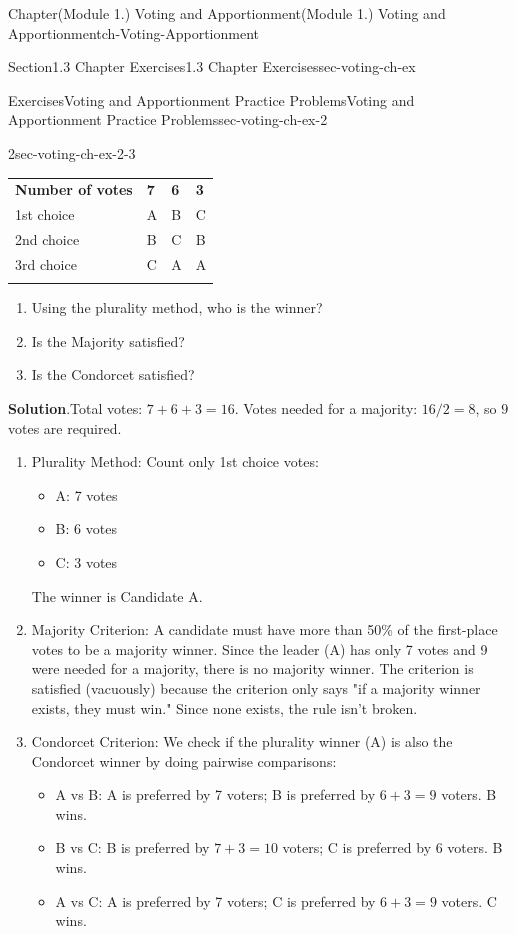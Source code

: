\documentclass[oneside,10pt,]{book}
\newcommand{\blocktitlefont}{\relax}
\newcommand{\tabularfont}{\relax}
\newcommand{\ptxlistdisc}{\raisebox{0.3ex}{\textbullet}}
\newcommand{\hrulethin}  {\noalign{\hrule height 0.04em}}
\begin{document}
\begin{chapterptx}{Chapter}{(Module 1.) Voting and Apportionment}{}{(Module 1.) Voting and Apportionment}{}{}{ch-Voting-Apportionment}
\begin{sectionptx}{Section}{1.3 Chapter Exercises}{}{1.3 Chapter Exercises}{}{}{sec-voting-ch-ex}
\begin{exercises-subsection-numberless}{Exercises}{Voting and Apportionment Practice Problems}{}{Voting and Apportionment Practice Problems}{}{}{sec-voting-ch-ex-2}
\begin{divisionexercise}{2}{}{}{sec-voting-ch-ex-2-3}
\begin{center}%
{\tabularfont%
\begin{tabular}{llll}\hrulethin
{\bfseries{}Number of votes}&{\bfseries{}7}&{\bfseries{}6}&{\bfseries{}3}\tabularnewline\hrulethin
1st choice&A&B&C\tabularnewline\hrulethin
2nd choice&B&C&B\tabularnewline\hrulethin
3rd choice&C&A&A\tabularnewline\hrulethin
\end{tabular}
}%
\end{center}%
%
\begin{enumerate}[label={(\alph*)}]
\item{}Using the plurality method, who is the winner?%
\item{}Is the Majority satisfied?%
\item{}Is the Condorcet satisfied?%
\end{enumerate}
%
\par\smallskip%
\noindent\textbf{\blocktitlefont Solution}.\hypertarget{sec-voting-ch-ex-2-3-2}{}\quad{}Total votes: \(7 + 6 + 3 = 16\). Votes needed for a majority: \(16/2 = 8\), so \(9\) votes are required.%
\par
%
\begin{enumerate}[label={(\alph*)}]
\item{}Plurality Method: Count only 1st choice votes:%
\begin{itemize}[label=\ptxlistdisc]
\item{}A: 7 votes%
\item{}B: 6 votes%
\item{}C: 3 votes%
\end{itemize}
The winner is Candidate A.%
\item{}Majority Criterion: A candidate must have more than 50\% of the first-place votes to be a majority winner. Since the leader (A) has only 7 votes and 9 were needed for a majority, there is no majority winner. The criterion is satisfied (vacuously) because the criterion only says "if a majority winner exists, they must win." Since none exists, the rule isn't broken.%
\item{}Condorcet Criterion: We check if the plurality winner (A) is also the Condorcet winner by doing pairwise comparisons:%
\begin{itemize}[label=\ptxlistdisc]
\item{}A vs B: A is preferred by 7 voters; B is preferred by \(6+3=9\) voters. B wins.%
\item{}B vs C: B is preferred by \(7+3=10\) voters; C is preferred by 6 voters. B wins.%
\item{}A vs C: A is preferred by 7 voters; C is preferred by \(6+3=9\) voters. C wins.%

\end{itemize}
\end{enumerate}
\end{divisionexercise}
\end{exercises-subsection-numberless}
\end{sectionptx}
\end{chapterptx}
\end{document}
